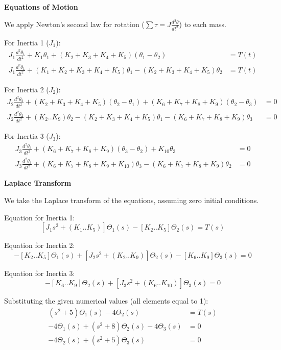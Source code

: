 \documentclass[11pt]{article}
\begin{document}
\noindent\textbf{Equations of Motion}

\vspace{8pt}

\noindent We apply Newton's second law for rotation ($\sum \tau = J \frac{d^2\theta}{dt^2}$) to each mass.

\vspace{8pt}

{For Inertia 1 ($J_1$):}
\begin{align*}
    J_1 \frac{d^2\theta_1}{dt^2} + K_1 \theta_1 + (K_2+K_3+K_4+K_5)(\theta_1 - \theta_2) &= T(t) \\
    J_1 \frac{d^2\theta_1}{dt^2} + (K_1+K_2+K_3+K_4+K_5)\theta_1 - (K_2+K_3+K_4+K_5)\theta_2 &= T(t)
\end{align*}

{For Inertia 2 ($J_2$):}
\begin{align*}
    J_2 \frac{d^2\theta_2}{dt^2} + (K_2+K_3+K_4+K_5)(\theta_2 - \theta_1) + (K_6+K_7+K_8+K_9)(\theta_2 - \theta_3) &= 0 \\
    J_2 \frac{d^2\theta_2}{dt^2} + (K_2..K_9)\theta_2 - (K_2+K_3+K_4+K_5)\theta_1 - (K_6+K_7+K_8+K_9)\theta_3 &= 0
\end{align*}

{For Inertia 3 ($J_3$):}
\begin{align*}
    J_3 \frac{d^2\theta_3}{dt^2} + (K_6+K_7+K_8+K_9)(\theta_3 - \theta_2) + K_{10}\theta_3 &= 0 \\
    J_3 \frac{d^2\theta_3}{dt^2} + (K_6+K_7+K_8+K_9+K_{10})\theta_3 - (K_6+K_7+K_8+K_9)\theta_2 &= 0
\end{align*}

\newpage
\noindent\textbf{Laplace Transform}

\vspace{12pt}

We take the Laplace transform of the equations, assuming zero initial conditions.

\vspace{8pt}

Equation for Inertia 1:
\[
[J_1 s^2 + (K_1..K_5)]\Theta_1(s) - [K_2..K_5]\Theta_2(s) = T(s)
\]

Equation for Inertia 2:
\[
-[K_2..K_5]\Theta_1(s) + [J_2 s^2 + (K_2..K_9)]\Theta_2(s) - [K_6..K_9]\Theta_3(s) = 0
\]

Equation for Inertia 3:
\[
-[K_6..K_9]\Theta_2(s) + [J_3 s^2 + (K_6..K_{10})]\Theta_3(s) = 0
\]

Substituting the given numerical values (all elements equal to 1):
\begin{align}
    (s^2 + 5)\Theta_1(s) - 4\Theta_2(s) &= T(s) \tag{1} \\
    -4\Theta_1(s) + (s^2 + 8)\Theta_2(s) - 4\Theta_3(s) &= 0 \tag{2} \\
    -4\Theta_2(s) + (s^2 + 5)\Theta_3(s) &= 0 \tag{3}
\end{align}
\end{document}
